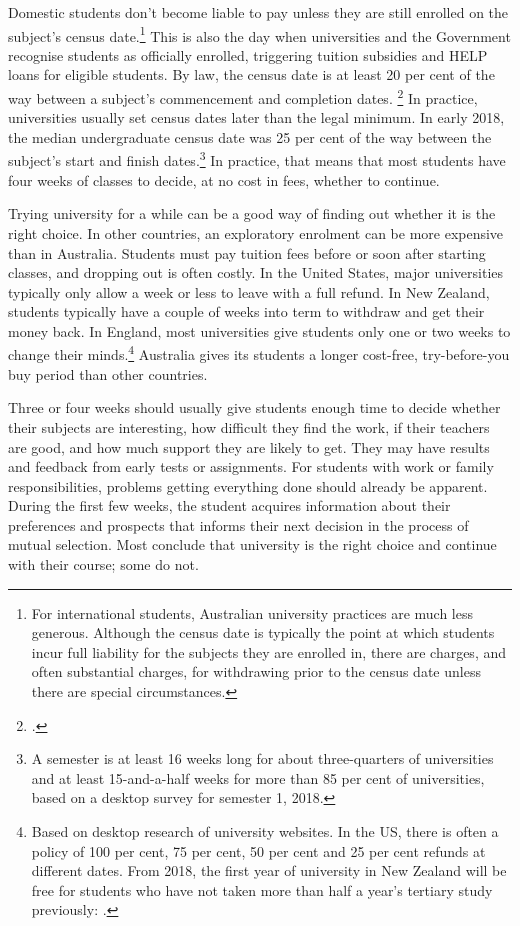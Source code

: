 Domestic students don't become liable to pay unless they are still enrolled on the subject's census date.\footnote{For international students, Australian university practices are much less generous. Although the census date is typically the point at which students incur full liability for the subjects they are enrolled in, there are charges, and often substantial charges, for withdrawing prior to the census date unless there are special circumstances.} 
This is also the day when universities and the Government recognise students as officially enrolled, triggering tuition subsidies and HELP loans for eligible students. By law, the census date is at least 20 per cent of the way between a subject's commencement and completion dates. \footcites[][section~6.30]{DIICCSRTE2013}
In practice, universities usually set census dates later than the legal minimum. In early 2018, the median undergraduate census date was 25 per cent of the way between the subject's start and finish dates.\footnote{A semester is at least 16 weeks long for about three-quarters of universities and at least 15-and-a-half weeks for more than 85 per cent of universities, based on a desktop survey for semester 1, 2018.} In practice, that means that most students have four weeks of classes to decide, at no cost in fees, whether to continue.

Trying university for a while can be a good way of finding out whether it is the right choice. In other countries, an exploratory enrolment can be more expensive than in Australia. Students must pay tuition fees before or soon after starting classes, and dropping out is often costly. In the United States, major universities typically only allow a week or less to leave with a full refund. In New Zealand, students typically have a couple of weeks into term to withdraw and get their money back. In England, most universities give students only one or two weeks to change their minds.\footnote{Based on desktop research of university websites. In the US, there is often a policy of 100 per cent, 75 per cent, 50 per cent and 25 per cent refunds at different dates. From 2018, the first year of university in New Zealand will be free for students who have not taken more than half a year's tertiary study previously: \textcite{TertiaryEducationCommissionNZ}.} Australia gives its students a longer cost-free, try-before-you buy period than other countries.

Three or four weeks should usually give students enough time to decide whether their subjects are interesting, how difficult they find the work, if their teachers are good, and how much support they are likely to get. They may have results and feedback from early tests or assignments. For students with work or family responsibilities, problems getting everything done should already be apparent. During the first few weeks, the student acquires information about their preferences and prospects that informs their next decision in the process of mutual selection. Most conclude that university is the right choice and continue with their course; some do not.

